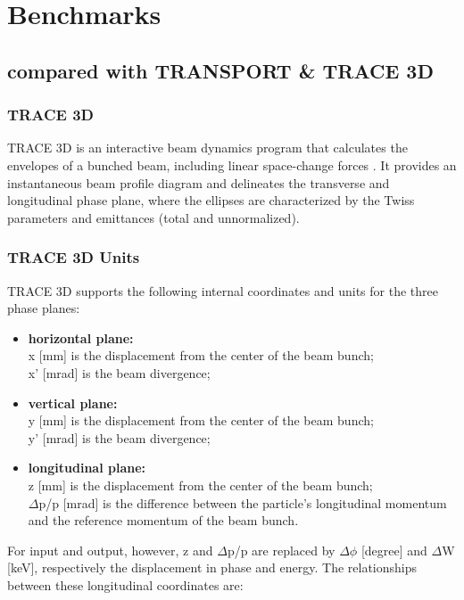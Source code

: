 
\chapter{Benchmarks}
\label{chp:benchmarks}

\section{\opalt compared with TRANSPORT \& TRACE 3D}
\label{sec:T3D}

\subsection{TRACE 3D}
TRACE 3D is an interactive beam dynamics program that calculates the envelopes of a bunched beam, including linear space-change forces  \cite{Trace_man}. It provides an instantaneous beam profile diagram and delineates the transverse and longitudinal phase plane, where the ellipses are characterized by the Twiss parameters and emittances (total and unnormalized).

\subsection{TRACE 3D Units}
\label{ssec:T3D_units}

TRACE 3D supports the following internal coordinates and units for the three phase planes:

\begin{itemize}
\item \textbf{horizontal plane:} \\
x [mm] is the displacement from the center of the beam bunch;\\
x' [mrad] is the beam divergence;

\item \textbf{vertical plane:}\\
y [mm] is the displacement from the center of the beam bunch; \\
y' [mrad] is the beam divergence;

\item \textbf{longitudinal plane:}\\
z [mm] is the displacement from the center of the beam bunch; \\
$\Delta$p/p [mrad] is the difference between the particle's longitudinal momentum and the reference momentum of the beam bunch.
\end{itemize}

For input and output, however, z and $\Delta$p/p are replaced by $\Delta\phi$ [degree] and $\Delta$W [keV], respectively the displacement in phase and energy. The relationships between these longitudinal coordinates are:

